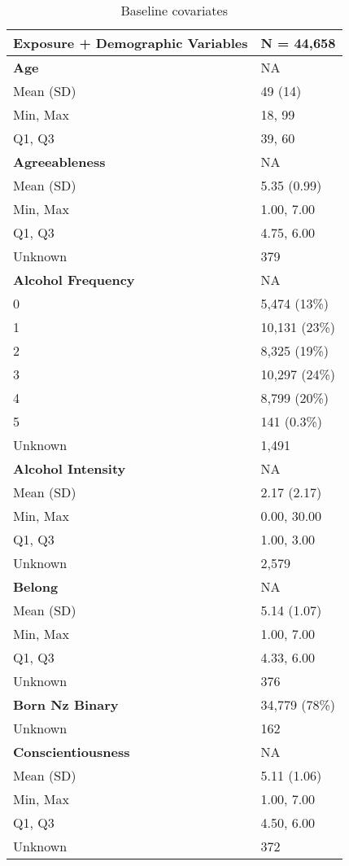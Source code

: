 \documentclass[
  single column]{article}
\begin{document}
\begin{longtable}[]{@{}ll@{}}

\caption{\label{tbl-table-baseline}Baseline covariates}

\tabularnewline

\toprule\noalign{}
\textbf{Exposure + Demographic Variables} & \textbf{N = 44,658} \\
\midrule\noalign{}
\endhead
\bottomrule\noalign{}
\endlastfoot
\textbf{Age} & NA \\
Mean (SD) & 49 (14) \\
Min, Max & 18, 99 \\
Q1, Q3 & 39, 60 \\
\textbf{Agreeableness} & NA \\
Mean (SD) & 5.35 (0.99) \\
Min, Max & 1.00, 7.00 \\
Q1, Q3 & 4.75, 6.00 \\
Unknown & 379 \\
\textbf{Alcohol Frequency} & NA \\
0 & 5,474 (13\%) \\
1 & 10,131 (23\%) \\
2 & 8,325 (19\%) \\
3 & 10,297 (24\%) \\
4 & 8,799 (20\%) \\
5 & 141 (0.3\%) \\
Unknown & 1,491 \\
\textbf{Alcohol Intensity} & NA \\
Mean (SD) & 2.17 (2.17) \\
Min, Max & 0.00, 30.00 \\
Q1, Q3 & 1.00, 3.00 \\
Unknown & 2,579 \\
\textbf{Belong} & NA \\
Mean (SD) & 5.14 (1.07) \\
Min, Max & 1.00, 7.00 \\
Q1, Q3 & 4.33, 6.00 \\
Unknown & 376 \\
\textbf{Born Nz Binary} & 34,779 (78\%) \\
Unknown & 162 \\
\textbf{Conscientiousness} & NA \\
Mean (SD) & 5.11 (1.06) \\
Min, Max & 1.00, 7.00 \\
Q1, Q3 & 4.50, 6.00 \\
Unknown & 372 \\

\end{longtable}
\end{document}
